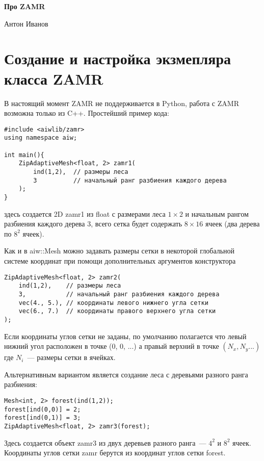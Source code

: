 \documentclass[12pt]{article}
\begin{document}
\begin{center}
  {\bf Про ZAMR}

  Антон Иванов
\end{center}

\tableofcontents

\section{Создание и настройка экзмепляра класса ZAMR}
 В настоящий момент ZAMR не поддерживается в Python, работа с ZAMR возможна только из C++.
 Простейший пример кода:
\begin{verbatim}
#include <aiwlib/zamr>
using namespace aiw;

int main(){
    ZipAdaptiveMesh<float, 2> zamr1(
        ind(1,2),  // размеры леса
        3          // начальный ранг разбиения каждого дерева
    );
}
\end{verbatim}
 здесь создается 2D zamr1 из float с размерами леса $1\times2$  и начальным рангом разбиения каждого дерева 3,
 всего сетка будет содержать $8\times16$ ячеек (два дерева по $8^2$ ячеек).

 Как и в {\sf aiw::Mesh} можно задавать размеры сетки в некоторой глобальной системе координат при помощи дополнительных аргументов конструктора 
\begin{verbatim}
ZipAdaptiveMesh<float, 2> zamr2(
    ind(1,2),    // размеры леса
    3,           // начальный ранг разбиения каждого дерева
    vec(4., 5.), // координаты левого нижнего угла сетки
    vec(6., 7.)  // координаты правого верхнего угла сетки
);
\end{verbatim}
 Если координаты углов сетки не заданы, по умолчанию полагается что левый нижний угол расположен в точке (0, 0, ...) а правый верхний в точке $(N_x, N_y ...)$
 где $N_i$~--- размеры сетки в ячейках.

 
Альтернативным вариантом является создание леса с деревьями разного ранга разбиения:
\begin{verbatim}
Mesh<int, 2> forest(ind(1,2));
forest[ind(0,0)] = 2;
forest[ind(0,1)] = 3;
ZipAdaptiveMesh<float, 2> zamr3(forest);
\end{verbatim}
Здесь создается объект zamr3 из двух деревьев разного ранга~--- $4^2$ и $8^2$ ячеек.
Координаты углов сетки zamr берутся из координат углов сетки forest.
\end{document}
